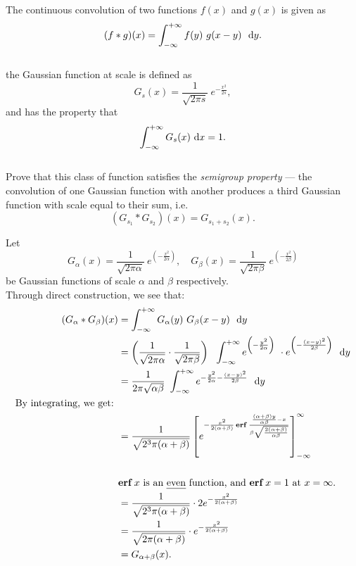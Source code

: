 
\begin{problem}
  The continuous convolution of two functions $f(x)$ and $g(x)$
  is given as
  \[
    (f*g)(x) = \int_{-\infty}^{+\infty} f(y)\ g(x-y)\ \text{ d} y.
  \]
  \\
  the Gaussian function at scale is defined as
  \[
    G_s(x) = \frac{1}{\sqrt{2\pi s}}\ e^{-\frac{x^2}{2s}},
  \]
  and has the property that
  \[
    \int_{-\infty}^{+\infty} G_s(x) \text{ d} x = 1.
  \]
  \\
  Prove that this class of function satisfies the \emph{semigroup property}
   --- the convolution of one Gaussian function with another produces a third
   Gaussian function with scale equal to their sum, i.e.
   \[
    (G_{s_1} * G_{s_2})(x) = G_{s_1 + s_2}(x).
   \]
\end{problem}
\newpage
\begin{Answer}
  Let \[ G_{\alpha}(x) = \frac{1}{\sqrt{2\pi \alpha}}\ e^{(-\frac{x^2}{2\alpha})}, \quad
  G_{\beta}(x) = \frac{1}{\sqrt{2\pi \beta}}\ e^{(-\frac{x^2}{2\beta})} \]
  be Gaussian functions of scale $\alpha$ and $\beta$ respectively.
  \\
  Through direct construction, we see that:
  \begin{align*}
    (G_{\alpha} * G_{\beta})(x) &= \int_{-\infty}^{+\infty} G_{\alpha}(y)\ G_{\beta}(x-y)\ \d y \\
      &= \left(\frac{1}{\sqrt{2\pi \alpha}} 
        \cdot \frac{1}{\sqrt{2\pi \beta}} \right)\ \ 
        \int_{-\infty}^{+\infty} e^{\left(-\frac{y^2}{2\alpha}\right)}\ \cdot e^{\left(-\frac{(x-y)^2}{2\beta}\right)}\ \d y \\
      &= \frac{1}{2\pi \sqrt{\alpha \beta}}\ 
        \int_{-\infty}^{+\infty} e^{ -\frac{y^2}{2\alpha} -\frac{(x-y)^2}{2\beta} }\ \d y \\
    \text{By integrating, we get: } \\
    &= \frac{1}{\sqrt{2^3\pi (\alpha + \beta)}}\left[ e^{-\frac{x^2}{2(\alpha + \beta)} \erf{\frac{\frac{(\alpha + \beta)y}{\alpha \beta} - x}{\beta \sqrt{\frac{2(\alpha + \beta)}{\alpha \beta}}}}  } \right]_{-\infty}^{\infty} \\
    \\
    \rlap{\text{$\erf{x}$ is an \emph{even} function, and $\erf{x} = 1$ at $x = \infty$.}} \\
    &= \frac{1}{\sqrt{2^3\pi (\alpha + \beta)}} \cdot 2 e^{-\frac{x^2}{2(\alpha + \beta)}} \\
    &= \frac{1}{\sqrt{2\pi (\alpha + \beta)}} \cdot e^{-\frac{x^2}{2(\alpha + \beta)}} \\
    &= G_{\alpha + \beta}(x).\\
    \end{align*}
\end{Answer}
